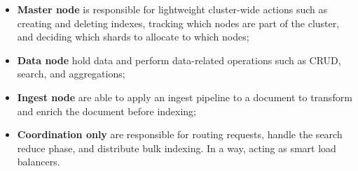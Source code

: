 \begin{itemize}
    \item \textbf{Master node} is responsible for lightweight cluster-wide actions such as creating and deleting indexes, tracking which nodes are part of the cluster, and deciding which shards to allocate to which nodes;
    \item \textbf{Data node} hold data and perform data-related operations such as CRUD, search, and aggregations;
    \item \textbf{Ingest node} are able to apply an ingest pipeline to a document to transform and enrich the document before indexing;
    \item \textbf{Coordination only} are responsible for routing requests, handle the search reduce phase, and distribute bulk indexing. In a way, acting as smart load balancers.
\end{itemize}



